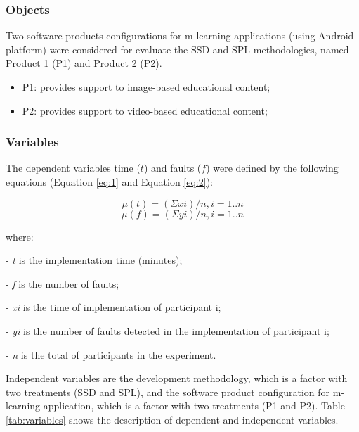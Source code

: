 \subsubsection*{Objects}

Two software products configurations for m-learning applications (using Android platform) were considered for evaluate the SSD and SPL methodologies, named Product 1 (P1) and Product 2 (P2).

\begin{itemize}
\item P1: provides support to image-based educational content;
\item P2: provides support to video-based educational content;
\end{itemize}

\subsubsection*{Variables}

The dependent variables time ($t$) and faults ($f$) were defined by the following equations (Equation \ref{eq:1} and Equation \ref{eq:2}):

\small

\begin{equation}\label{eq:1}
\mu{(t)}=(\Sigma xi)/n, i = 1..n
\end{equation}
\begin{equation}\label{eq:2}
\mu{(f)}=(\Sigma yi)/n, i = 1..n
\end{equation}
\normalsize 

where:

- \textit{t} is the implementation time (minutes);

- \textit{f} is the number of faults;

- \textit{xi} is the time of implementation of participant i;

- \textit{yi} is the number of faults detected in the implementation of participant i;

- \textit{n} is the total of participants in the experiment.

\normalsize

\vspace{5mm}

Independent variables are the development methodology, which is a factor with two treatments (SSD and SPL), and the software product configuration for m-learning application, which is a factor with two treatments (P1 and P2). Table \ref{tab:variables} shows the description of dependent and independent variables.


